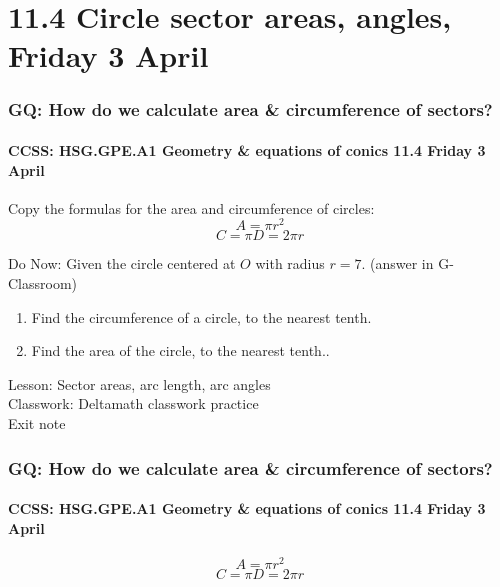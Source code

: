 \documentclass{beamer}
\begin{document}
\section{11.4 Circle sector areas, angles, Friday 3 April} 
\frame
{
  \frametitle{GQ: How do we calculate area \& circumference of sectors?}
  \framesubtitle{CCSS: HSG.GPE.A1 Geometry \& equations of conics \hfill \alert{11.4 Friday 3 April}}

  Copy the formulas for the area and circumference of circles:
\[A=\pi r^2\]
\[C=\pi D = 2\pi r\]

  \begin{block}{Do Now: Given the circle centered at $O$ with radius $r=7$. (answer in G-Classroom)}
      \begin{enumerate}
        \item Find the circumference of a circle, to the nearest tenth.
        \item Find the area of the circle, to the nearest tenth..
      \end{enumerate}
    \end{block}

    Lesson: Sector areas, arc length, arc angles \\ 
    Classwork: Deltamath classwork practice\\ 
    Exit note
}

\frame
{
  \frametitle{GQ: How do we calculate area \& circumference of sectors?}
  \framesubtitle{CCSS: HSG.GPE.A1 Geometry \& equations of conics \hfill \alert{11.4 Friday 3 April}}

\[A=\pi r^2\]
\[C=\pi D = 2\pi r\]
\begin{flushright}
\end{flushright}}
\end{document}
